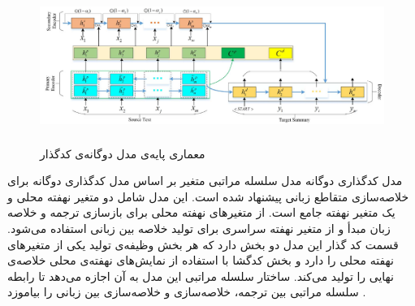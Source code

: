 \begin{figure}[!h]
	\begin{center}
		\includegraphics[height=5cm]{dualـencoder.png}
	\end{center}
	\caption{معماری پایه‌‌ی مدل دوگانه‌ی کدگذار 	 \cite{yao2018dual}}
	\label{fig:dual_encoder}
	\medskip
	\small
\end{figure}


مدل کدگذاری دوگانه مدل سلسله مراتبی متغیر بر اساس مدل کدگذاری دوگانه برای خلاصه‌سازی متقاطع زبانی
پیشنهاد شده است. این مدل شامل دو متغیر نهفته محلی و یک متغیر نهفته جامع است. از متغیرهای نهفته محلی برای بازسازی ترجمه و خلاصه زبان مبدأ و از متغیر نهفته سراسری برای تولید خلاصه بین زبانی استفاده می‌شود. قسمت کد گذار این مدل دو بخش دارد که هر بخش وظیفه‌ی تولید یکی از متغیرهای نهفته محلی را دارد و بخش کدگشا با استفاده از نمایش‌های نهفته‌ی محلی خلاصه‌ی نهایی را تولید می‌کند.
ساختار سلسله مراتبی این مدل به آن اجازه می‌دهد تا رابطه سلسله مراتبی بین ترجمه، خلاصه‌سازی و خلاصه‌سازی بین زبانی را بیاموزد \cite{variational}.

